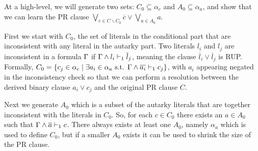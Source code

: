 At a high-level, we will generate two sets: $C_0 \subseteq \alpha_c$ and $A_0
\subseteq \alpha_a$, and show that we can learn the PR clause $\bigvee_{c \in C
\backslash C_0} \overline{c} \lor \bigvee_{a \in A_0} a$. 

First we start with $C_0$, the set of literals in the conditional part that are
inconsistent with any literal in the autarky part. Two literals $l_i$ and $l_j$
are inconsistent in a formula $\Gamma$ if
$\Gamma \land l_i \vdash_1 \overline{l}_j$, meaning the clause
$\overline{l}_i \lor \overline{l}_j$ is RUP. Formally, $C_0 = \{c_j \in \alpha_c
\mid \exists a_i \in \alpha_a \text{ s.t. }
\Gamma \land \overline{a_i} \vdash_1 c_j \}$, with $a_i$ appearing negated
in the inconsistency check so that we can perform a resolution between the
derived binary clause  $a_i \lor c_j$ and the original PR clause $C$.

Next we generate $A_0$ which is a subset of the autarky literals that are
together inconsistent with the literals in $C_0$. So, for each $c \in C_0$ there
exists an $a \in A_0$ such that $\Gamma \land \overline{a} \vdash_1 c$. There always
exists at least one $A_0$, namely $\alpha_a$ which is used to define $C_0$, but
if a smaller $A_0$ exists it can be used to shrink the size of the PR clause. 


%
%
%
%
%
%
%



